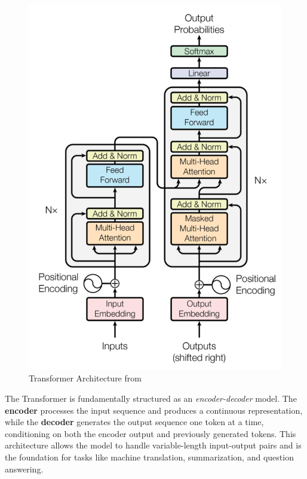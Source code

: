 \begin{figure}[H]
    \centering
    \centering
    \includegraphics[width=0.45\linewidth]{Images/Transformer_architecture3.png}
    \caption{Transformer Architecture from~\cite{vaswani2017attention}}\label{fig:Tranformer}
\end{figure}

The Transformer is fundamentally structured as an \textit{encoder-decoder} model. The \textbf{encoder} processes the input sequence and produces a continuous representation, while the \textbf{decoder} generates the output sequence one token at a time, conditioning on both the encoder output and previously generated tokens. This architecture allows the model to handle variable-length input-output pairs and is the foundation for tasks like machine translation, summarization, and question answering.


